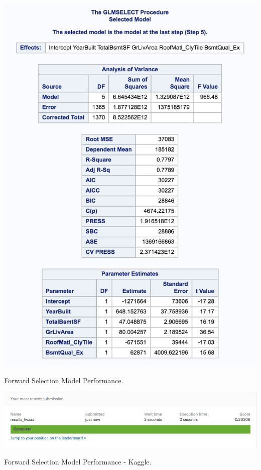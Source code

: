 \documentclass[11pt]{scrartcl} %
\begin{document}
\hrulefill
\begin{table}[H] %
	\centering %
	\includegraphics[scale=.3]{../graphics/A2FWresults}
	\caption{Forward Selection Model Performance.}
	\label{tab:A2FWperf}
\end{table}
\hrulefill
\begin{table}[H] %
	\centering %
	\includegraphics[scale=.4]{../graphics/A2FWKaggle}
	\caption{Forward Selection Model Performance - Kaggle.}
	\label{tab:A2FWKaggle}
\end{table}
\end{document}
